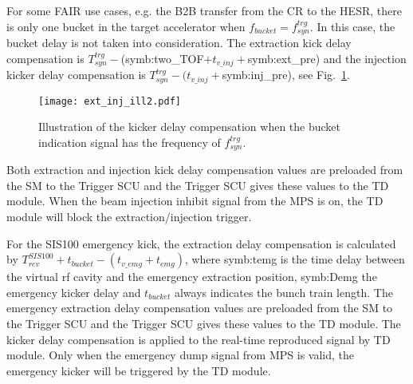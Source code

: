 For some FAIR use cases, e.g. the B2B transfer from the CR to the HESR, there is only one bucket in the target accelerator when $f_{\mathit{bucket}}=f_{\mathit{syn}}^{\mathit{trg}}$. In this case, the bucket delay is not taken into consideration. The extraction kick delay compensation is $T_{\mathit{syn}}^{\mathit{trg}} -$(\gls{symb:two_TOF}$ + t_{v\_inj}+ $\gls{symb:ext_pre}) and the injection kicker delay compensation is $T_{\mathit{syn}}^{\mathit{trg}} - (t_{v\_inj}+ $\gls{symb:inj_pre}), see Fig.~\ref{ext_inj_kicker1}. 
\begin{figure}[!htb]
   \centering   
   \texttt{[image: ext\_inj\_ill2.pdf]}
   \caption{Illustration of the kicker delay compensation when the bucket indication signal has the frequency of $f_{\mathit{syn}}^{\mathit{trg}}$.}
   \label{ext_inj_kicker1}
\end{figure}



Both extraction and injection kick delay compensation values are preloaded from the SM to the Trigger SCU and the Trigger SCU gives these values to the TD module. When the beam injection inhibit signal from the MPS is on, the TD module will block the extraction/injection trigger.

For the SIS100 emergency kick, the extraction delay compensation is calculated by $T_{\mathit{rev}}^{\mathit{SIS100}} + t_{bucket} - (t_{v\_emg} + t_{emg})$, where \gls{symb:temg} is the time delay between the virtual rf cavity and the emergency extraction position, \gls{symb:Demg} the emergency kicker delay and $t_{bucket}$ always indicates the bunch train length. The emergency extraction delay compensation values are preloaded from the SM to the Trigger SCU and the Trigger SCU gives these values to the TD module. The kicker delay compensation is applied to the real-time reproduced signal by TD module. Only when the emergency dump signal from MPS is valid, the emergency kicker will be triggered by the TD module.


